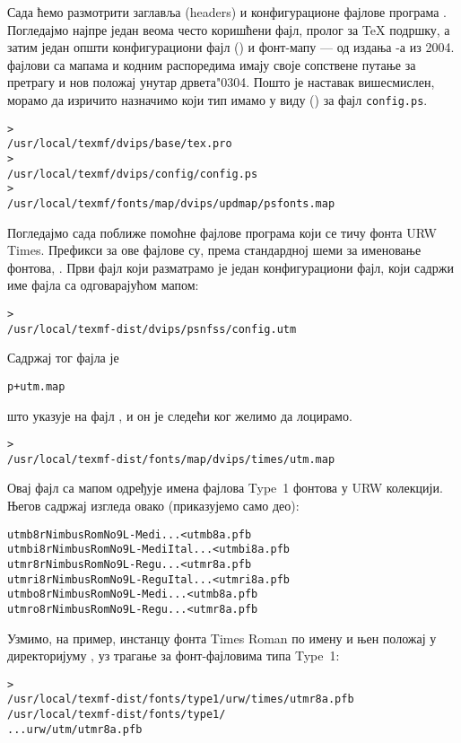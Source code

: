 \documentclass{article}
\begin{document}
Сада ћемо размотрити заглавља (\textenglish{headers}) и
конфигурационе фајлове програма . Погледајмо најпре
један веома често коришћени фајл, пролог  за \TeX{}
подршку, а затим један општи конфигурациони фајл () и
\PS{} фонт-мапу  --- од издања \TL{}-а из 2004.
фајлови са мапама и кодним распоредима имају своје сопствене путање
за претрагу и нов положај унутар  дрвета\char"0304.
Пошто је наставак  вишесмислен, морамо да изричито
назначимо који тип имамо у виду () за фајл
\texttt{config.ps}.
\begin{alltt}> 
   /usr/local/texmf/dvips/base/tex.pro
> 
   /usr/local/texmf/dvips/config/config.ps
> 
   /usr/local/texmf/fonts/map/dvips/updmap/psfonts.map
\end{alltt}

Погледајмо сада поближе помоћне фајлове програма \PS{} који се тичу
фонта URW Times. Префикси за ове фајлове су, према стандардној
шеми за именовање фонтова, . Први фајл који разматрамо је
један конфигурациони фајл, који садржи име фајла са одговарајућом
мапом:
\begin{alltt}> 
   /usr/local/texmf-dist/dvips/psnfss/config.utm
\end{alltt}
Садржај тог фајла је
\begin{alltt}  p +utm.map
\end{alltt}
што указује на фајл , и он је следећи ког желимо да
лоцирамо.
\begin{alltt}> 
   /usr/local/texmf-dist/fonts/map/dvips/times/utm.map
\end{alltt}
Овај фајл са мапом одређује имена фајлова Type~1 \PS{} фонтова у URW
колекцији. Његов садржај изгледа овако (приказујемо само део):
\begin{alltt}utmb8r  NimbusRomNo9L-Medi    ... <utmb8a.pfb
utmbi8r NimbusRomNo9L-MediItal... <utmbi8a.pfb
utmr8r  NimbusRomNo9L-Regu    ... <utmr8a.pfb
utmri8r NimbusRomNo9L-ReguItal... <utmri8a.pfb
utmbo8r NimbusRomNo9L-Medi    ... <utmb8a.pfb
utmro8r NimbusRomNo9L-Regu    ... <utmr8a.pfb
\end{alltt}
Узмимо, на пример, инстанцу фонта \textenglish{Times Roman} по имену
 и  њен положај у директоријуму
, уз трагање за фонт-фајловима типа Type~1:
\begin{alltt}> 
\ifSingleColumn   /usr/local/texmf-dist/fonts/type1/urw/times/utmr8a.pfb
\else   /usr/local/texmf-dist/fonts/type1/
... urw/utm/utmr8a.pfb
\fi\end{alltt}
\end{document}
